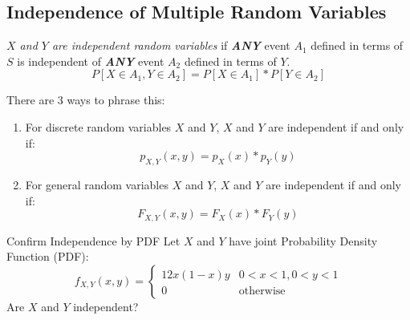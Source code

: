 	\subsection{Independence of Multiple Random Variables} \label{subsec:Independence of Multiple Random Variables}
		\begin{definition} \label{def:Independence of Multiple Random Variables}
			\emph{$X$ and $Y$ are independent random variables} if \emph{\textbf{ANY}} event $A_{1}$ defined in terms of $S$ is independent of \emph{\textbf{ANY}} event $A_{2}$ defined in terms of $Y$.
			\begin{equation} \label{eq:Independence of Multiple Random Variables}
				P \left[ X \in A_{1}, Y \in A_{2} \right] = P \left[ X \in A_{1} \right] * P \left[ Y \in A_{2} \right]
			\end{equation}
		\end{definition}
	There are 3 ways to phrase this:
	\begin{enumerate}
		\item For discrete random variables $X$ and $Y$, $X$ and $Y$ are independent if and only if:
			\begin{equation} \label{eq:Independence of Multiple Discrete Random Variables Using PMF}
				p_{X,Y} \left( x,y \right) = p_{X} \left( x \right) * p_{Y} \left( y \right)
			\end{equation}
	
		\item For general random variables $X$ and $Y$, $X$ and $Y$ are independent if and only if:
			\begin{equation} \label{eq:Independence of Multiple General Random Variables Using CDF}
				F_{X,Y} \left( x,y \right) = F_{X} \left( x \right) * F_{Y} \left( y \right)
			\end{equation}
	\end{enumerate}
		\begin{example}{Confirm Independence by PDF}
			Let $X$ and $Y$ have joint Probability Density Function (PDF):
			\begin{equation*}
				f_{X,Y} \left( x,y \right) = \begin{cases}
					12x \left( 1-x \right)y & 0 < x < 1, 0 < y < 1 \\
					0 & \text{otherwise}
				\end{cases}
			\end{equation*}
			Are $X$ and $Y$ independent?
		\end{example}

